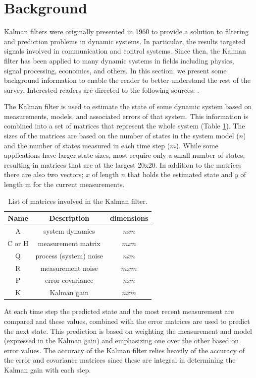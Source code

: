 \documentclass[11pt]{article}
\begin{document}
\section{Background}
Kalman filters \cite{kalman1960new} were originally presented in 1960 to provide a solution to filtering and prediction problems in dynamic systems. In particular, the results targeted signals involved in communication and control systems. Since then, the Kalman filter has been applied to many dynamic systems in fields including physics, signal processing, economics, and others. In this section, we present some background information to enable the reader to better understand the rest of the survey. Interested readers are directed to the following sources: \cite{blackman1986multiple, welch1995introduction, budhiraja2007survey, kalman1960new}.

The Kalman filter is used to estimate the state of some dynamic system based on measurements, models, and associated errors of that system. This information is combined into a set of matrices that represent the whole system (Table \ref{mats}). The sizes of the matrices are based on the number of states in the system model ($n$) and the number of states measured in each time step ($m$). While some applications have larger state sizes, most require only a small number of states, resulting in matrices that are at the largest 20x20. In addition to the matrices there are also two vectors; $x$ of length $n$ that holds the estimated state and $y$ of length m for the current measurements.

\begin{table}
\caption{List of matrices involved in the Kalman filter.} 
\label{mats}
\centering
\begin{tabular}{||c c c||} 
\hline
Name & Description & dimensions \\ [0.5ex] 
\hline\hline
A & system dynamics & $nxn$\\
\hline
C or H & measurement matrix & $mxn$\\
\hline
Q & process (system) noise & $nxn$\\
\hline
R & measurement noise & $mxm$\\
\hline
P & error covariance & $nxn$\\
\hline
K & Kalman gain & $nxm$\\
\hline
\end{tabular}
\end{table}

At each time step the predicted state and the most recent measurement are compared and these values, combined with the error matrices are used to predict the next state. This prediction is based on weighting the measurement and model (expressed in the Kalman gain) and emphasizing one over the other based on error values. The accuracy of the Kalman filter relies heavily of the accuracy of the error and covariance matrices since these are integral in determining the Kalman gain with each step.
\end{document}
